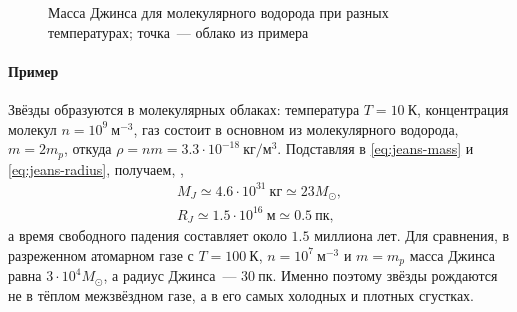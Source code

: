 \begin{figure}
    \centering
    \vspace{-1pc}
    \caption{Масса Джинса для молекулярного водорода при разных температурах; точка~--- облако из примера}
    \label{pic:jeans-mass}
\end{figure}
\paragraph{Пример} Звёзды образуются в молекулярных облаках: температура $T = 10~\text{К}$, концентрация молекул $n = 10^9~\text{м}^{-3}$, газ состоит в основном из молекулярного водорода, $m = 2m_p$, откуда $\rho = nm = 3.3 \cdot 10^{-18}~\text{кг}/\text{м}^3$. Подставляя в \eqref{eq:jeans-mass} и \eqref{eq:jeans-radius}, получаем, ,
\begin{gather*}
    M_J \simeq 4.6 \cdot 10^{31}~\text{кг} \simeq 23 M_\odot,\\
    R_J \simeq 1.5 \cdot 10^{16}~\text{м} \simeq 0.5~\text{пк},
\end{gather*}
а время свободного падения составляет около $1.5$ миллиона лет. Для сравнения, в разреженном атомарном газе с $T = 100~\text{К}$, $n = 10^7~\text{м}^{-3}$ и $m = m_p$ масса Джинса равна $3 \cdot 10^4 M_\odot$, а радиус Джинса~--- $30~\text{пк}$. Именно поэтому звёзды рождаются не в тёплом межзвёздном газе, а в его самых холодных и плотных сгустках.

